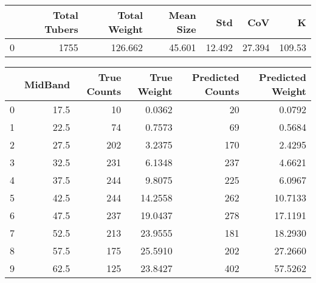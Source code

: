 \begin{tabular}{lrrrrrr}
\toprule
{} &  Total Tubers &  Total Weight &  Mean Size &     Std &     CoV &       K \\
\midrule
0 &          1755 &       126.662 &     45.601 &  12.492 &  27.394 &  109.53 \\
\bottomrule
\end{tabular}

\begin{tabular}{lrrrrr}
\toprule
{} &  MidBand &  True Counts &  True Weight &  Predicted Counts &  Predicted Weight \\
\midrule
0 &     17.5 &           10 &       0.0362 &                20 &            0.0792 \\
1 &     22.5 &           74 &       0.7573 &                69 &            0.5684 \\
2 &     27.5 &          202 &       3.2375 &               170 &            2.4295 \\
3 &     32.5 &          231 &       6.1348 &               237 &            4.6621 \\
4 &     37.5 &          244 &       9.8075 &               225 &            6.0967 \\
5 &     42.5 &          244 &      14.2558 &               262 &           10.7133 \\
6 &     47.5 &          237 &      19.0437 &               278 &           17.1191 \\
7 &     52.5 &          213 &      23.9555 &               181 &           18.2930 \\
8 &     57.5 &          175 &      25.5910 &               202 &           27.2660 \\
9 &     62.5 &          125 &      23.8427 &               402 &           57.5262 \\
\bottomrule
\end{tabular}

